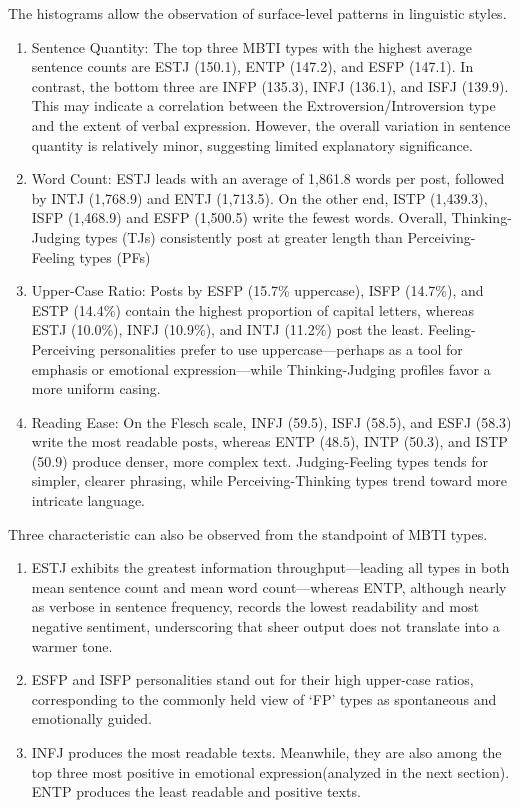 \documentclass[12pt]{article}
\numberwithin{figure}{section}  %
\begin{document}
	The histograms allow the observation of surface-level patterns in linguistic styles.
	\begin{enumerate}
	\item Sentence Quantity: The top three MBTI types with the highest average
	sentence counts are ESTJ (150.1), ENTP (147.2), and ESFP (147.1). In
	contrast, the bottom three are INFP (135.3), INFJ (136.1), and ISFJ (139.9).
	This may indicate a correlation between the Extroversion/Introversion type
	and the extent of verbal expression. However, the overall variation in
	sentence quantity is relatively minor, suggesting limited explanatory
	significance.
	\item Word Count: ESTJ leads with an average of 1,861.8 words per post,
	followed by INTJ (1,768.9) and ENTJ (1,713.5). On the other end, ISTP
	(1,439.3), ISFP (1,468.9) and ESFP (1,500.5) write the fewest words.
	Overall, Thinking-Judging types (TJs) consistently post at greater length
	than Perceiving-Feeling types (PFs)
	\item Upper-Case Ratio:  Posts by ESFP (15.7\% uppercase), ISFP (14.7\%),
	and ESTP (14.4\%) contain the highest proportion of capital letters, whereas
	ESTJ (10.0\%), INFJ (10.9\%), and INTJ (11.2\%) post the least.
	Feeling-Perceiving personalities prefer to use uppercase—perhaps as a tool
	for emphasis or emotional expression—while Thinking-Judging profiles favor a
	more uniform casing. 
	\item Reading Ease: On the Flesch scale, INFJ (59.5), ISFJ (58.5), and ESFJ
	(58.3) write the most readable posts, whereas ENTP (48.5), INTP (50.3), and
	ISTP (50.9) produce denser, more complex text. Judging-Feeling types tends
	for simpler, clearer phrasing, while Perceiving-Thinking types trend toward
	more intricate language.
	\end{enumerate}
	
	Three characteristic can also be observed from the standpoint of MBTI types.
	\begin{enumerate}
	\item ESTJ exhibits the greatest information throughput—leading all types in
	both mean sentence count and mean word count—whereas ENTP, although nearly
	as verbose in sentence frequency, records the lowest readability and most
	negative sentiment, underscoring that sheer output does not translate into a
	warmer tone.
	\item ESFP and ISFP personalities stand out for their high upper-case
	ratios, corresponding to the commonly held view of ‘FP’ types as spontaneous
	and emotionally guided.
	\item INFJ produces the most readable texts. Meanwhile, they are also among
	the top three most positive in emotional expression(analyzed in the next
	section). ENTP produces the least readable and positive texts.

	\end{enumerate}
	 
\end{document}
